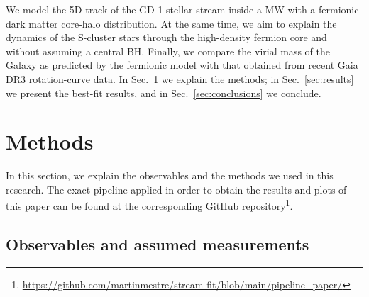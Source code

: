 \documentclass[twocolumn]{aa}
\begin{document}
We model the 5D track of the GD-1 stellar stream inside a MW with a fermionic dark matter core-halo distribution. At the same time, we aim to explain the dynamics of the S-cluster stars through the high-density fermion core and without assuming a central BH. Finally, we compare the virial mass of the Galaxy as predicted by the fermionic model with that obtained from recent Gaia DR3 rotation-curve data. In Sec.~\ref{sec:methodology} we explain the methods; in Sec.~\ref{sec:results} we present the best-fit results, and in Sec.~\ref{sec:conclusions} we conclude.

\section{Methods}
\label{sec:methodology}
In this section, we explain the observables and the methods we used in this research.
The exact pipeline applied in order to obtain the results and plots of this paper
can be found at the corresponding GitHub repository\footnote{
\url{https://github.com/martinmestre/stream-fit/blob/main/pipeline_paper/}}.

\subsection{Observables and assumed measurements}
\label{sec:observables}
\end{document}
